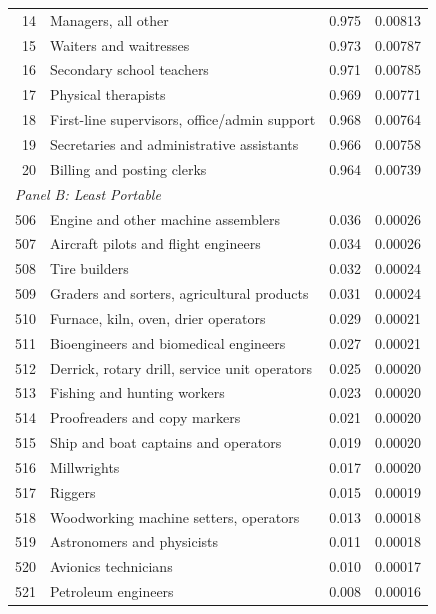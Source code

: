 \documentclass[12pt]{article}
\begin{document}
\begin{table}[H]
\begin{tabular}{rlcc}
14 & Managers, all other                           & 0.975 & 0.00813 \\
15 & Waiters and waitresses                        & 0.973 & 0.00787 \\
16 & Secondary school teachers                     & 0.971 & 0.00785 \\
17 & Physical therapists                           & 0.969 & 0.00771 \\
18 & First-line supervisors, office/admin support  & 0.968 & 0.00764 \\
19 & Secretaries and administrative assistants     & 0.966 & 0.00758 \\
20 & Billing and posting clerks                    & 0.964 & 0.00739 \\
\midrule
\multicolumn{4}{l}{\textit{Panel B: Least Portable}} \\
506 & Engine and other machine assemblers          & 0.036 & 0.00026 \\
507 & Aircraft pilots and flight engineers         & 0.034 & 0.00026 \\
508 & Tire builders                                & 0.032 & 0.00024 \\
509 & Graders and sorters, agricultural products   & 0.031 & 0.00024 \\
510 & Furnace, kiln, oven, drier operators         & 0.029 & 0.00021 \\
511 & Bioengineers and biomedical engineers        & 0.027 & 0.00021 \\
512 & Derrick, rotary drill, service unit operators & 0.025 & 0.00020 \\
513 & Fishing and hunting workers                  & 0.023 & 0.00020 \\
514 & Proofreaders and copy markers                & 0.021 & 0.00020 \\
515 & Ship and boat captains and operators         & 0.019 & 0.00020 \\
516 & Millwrights                                  & 0.017 & 0.00020 \\
517 & Riggers                                      & 0.015 & 0.00019 \\
518 & Woodworking machine setters, operators       & 0.013 & 0.00018 \\
519 & Astronomers and physicists                   & 0.011 & 0.00018 \\
520 & Avionics technicians                         & 0.010 & 0.00017 \\
521 & Petroleum engineers                          & 0.008 & 0.00016 \\

\end{tabular}
\end{table}
\end{document}
